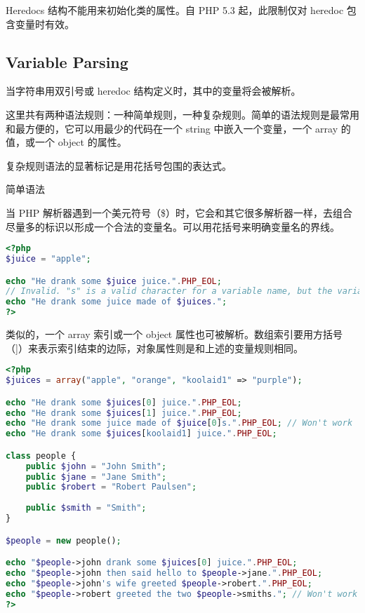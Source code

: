 Heredocs 结构不能用来初始化类的属性。自 PHP 5.3 起，此限制仅对 heredoc 包含变量时有效。

\subsection{Variable Parsing}

当字符串用双引号或 heredoc 结构定义时，其中的变量将会被解析。

这里共有两种语法规则：一种简单规则，一种复杂规则。简单的语法规则是最常用和最方便的，它可以用最少的代码在一个 string 中嵌入一个变量，一个 array 的值，或一个 object 的属性。

复杂规则语法的显著标记是用花括号包围的表达式。

\begin{compactitem}
\item 简单语法

当 PHP 解析器遇到一个美元符号（\$）时，它会和其它很多解析器一样，去组合尽量多的标识以形成一个合法的变量名。可以用花括号来明确变量名的界线。

\begin{lstlisting}[language=PHP]
<?php
$juice = "apple";

echo "He drank some $juice juice.".PHP_EOL;
// Invalid. "s" is a valid character for a variable name, but the variable is $juice.
echo "He drank some juice made of $juices.";
?>
\end{lstlisting}

类似的，一个 array 索引或一个 object 属性也可被解析。数组索引要用方括号（]）来表示索引结束的边际，对象属性则是和上述的变量规则相同。

\begin{lstlisting}[language=PHP]
<?php
$juices = array("apple", "orange", "koolaid1" => "purple");

echo "He drank some $juices[0] juice.".PHP_EOL;
echo "He drank some $juices[1] juice.".PHP_EOL;
echo "He drank some juice made of $juice[0]s.".PHP_EOL; // Won't work
echo "He drank some $juices[koolaid1] juice.".PHP_EOL;

class people {
    public $john = "John Smith";
    public $jane = "Jane Smith";
    public $robert = "Robert Paulsen";
    
    public $smith = "Smith";
}

$people = new people();

echo "$people->john drank some $juices[0] juice.".PHP_EOL;
echo "$people->john then said hello to $people->jane.".PHP_EOL;
echo "$people->john's wife greeted $people->robert.".PHP_EOL;
echo "$people->robert greeted the two $people->smiths."; // Won't work
?>
\end{lstlisting}


\end{compactitem}

